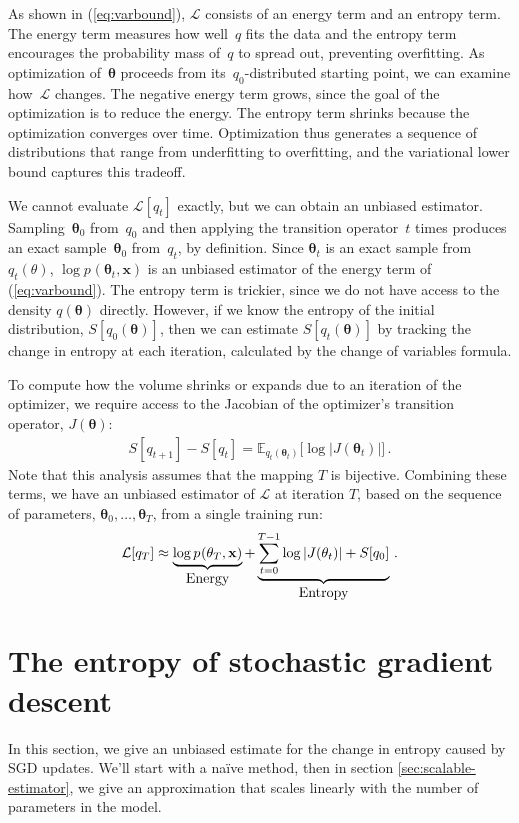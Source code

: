\documentclass[]{article}
\newcommand{\vx}{\mathbf{x}}
\newcommand{\expect}{\mathbb{E}}
\newcommand{\varL}{\mathcal{L}}
\newcommand{\data}{\vx}
\newcommand{\params}{\mathbf{\theta}}
\newcommand{\subjointdist}[2]{p_{#1}(\params_{#2} , \data)}
\begin{document}
As shown in (\ref{eq:varbound}), $\varL$ consists of an energy term and an entropy term.
The energy term measures how well~$q$ fits the data and the entropy term encourages the probability mass of~$q$ to spread out, preventing overfitting.
As optimization of~$\params$ proceeds from its~$q_0$-distributed starting point, we can examine how~$\varL$ changes.
The negative energy term grows, since the goal of the optimization is to reduce the energy.
The entropy term shrinks because the optimization converges over time.
Optimization thus generates a sequence of distributions that range from underfitting to overfitting, and the variational lower bound captures this tradeoff.

We cannot evaluate $\varL[q_t]$ exactly, but we can obtain an unbiased estimator.
Sampling~$\params_0$ from~$q_0$ and then applying the transition operator~$t$ times produces an exact sample~$\params_0$ from~$q_t$, by definition.
Since $\params_t$ is an exact sample from $q_t(\theta)$, $\log\subjointdist{}{t}$ is an unbiased estimator of the energy term of (\ref{eq:varbound}).
The entropy term is trickier, since we do not have access to the density $q(\params)$ directly.
However, if we know the entropy of the initial distribution, $S[q_0(\params)]$, then we can estimate $S[q_t(\params)]$ by tracking the change in entropy at each iteration, calculated by the change of variables formula. %

To compute how the volume shrinks or expands due to an iteration of the optimizer, we require access to the Jacobian of the optimizer's transition operator, $J(\params)$:
%
\begin{align}
S[q_{t+1}] - S[q_t] =
  \expect_{q_t(\params_t)} \big[ \log
    \left| J(\params_t) \right| \big] \,.
\end{align}
%
Note that this analysis assumes that the mapping $T$ is bijective.
Combining these terms, we have an unbiased estimator of $\varL$ at iteration $T$,
based on the sequence of parameters, $\params_0, \ldots, \params_T$, from a single training run:
\begin{align}
\varL[q_T] \approx
  \underbrace{\log \subjointdist{}{T}}_{\textnormal{\normalsize Energy}} +
  \underbrace{\sum_{t=0}^{T-1} \log \left| J(\params_t) \right| + S[q_0]}_{\textnormal{\normalsize Entropy}} \,.
\label{eq:entropy-bound}
\end{align}

\section{The entropy of stochastic gradient descent}
In this section, we give an unbiased estimate for the change in entropy caused by SGD updates.
We'll start with a na\"ive method, then in section \ref{sec:scalable-estimator}, we give an approximation that scales linearly with the number of parameters in the model.
\end{document}
